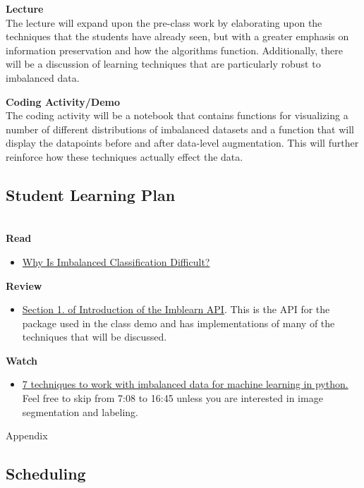 \documentclass[12pt]{amsart}
\begin{document}
\textbf{Lecture} \\
The lecture will expand upon the pre-class work by elaborating upon the techniques that the students have already seen, 
but with a greater emphasis on information preservation and how the algorithms function.
Additionally, there will be a discussion of learning techniques that are particularly robust to imbalanced data.

\textbf{Coding Activity/Demo}\\
The coding activity will be a notebook that contains functions for visualizing a number of different distributions of imbalanced datasets
and a function that will display the datapoints before and after data-level augmentation. 
This will further reinforce how these techniques actually effect the data.


\subsection{Student Learning Plan} \phantom{} \\

\textbf{Read}
\begin{itemize}
	\item \href{https://machinelearningmastery.com/imbalanced-classification-is-hard/}{Why Is Imbalanced Classification Difficult?}
\end{itemize}
\textbf{Review}
\begin{itemize}
	\item \href{https://imbalanced-learn.org/stable/introduction.html}{Section 1. of Introduction of the Imblearn API}. 
	This is the API for the package used in the class demo and has implementations of many of the techniques that will be discussed.
\end{itemize}
\textbf{Watch}
\begin{itemize}
	\item \href{https://www.youtube.com/watch?v=vOBbKNwi6Go}{7 techniques to work with imbalanced data for machine learning in python.}
		Feel free to skip from 7:08 to 16:45 unless you are interested in image segmentation and labeling.
\end{itemize}



\clearpage
\begin{center}
	\large Appendix
\end{center}

\setcounter{subsection}{-1}
\subsection{Scheduling}
\end{document}
